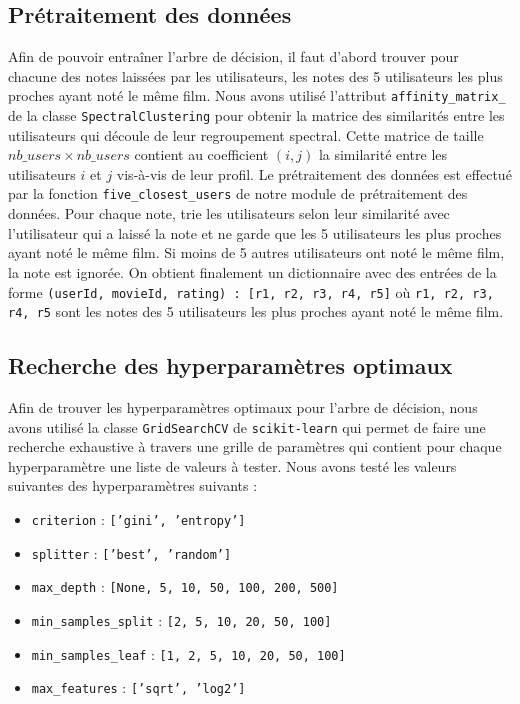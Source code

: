 \documentclass{article}
\begin{document}
\subsection{Prétraitement des données}
Afin de pouvoir entraîner l'arbre de décision, il faut d'abord trouver pour chacune
des notes laissées par les utilisateurs, les notes des 5 utilisateurs les plus
proches ayant noté le même film.
\vskip 0.25cm
Nous avons utilisé l'attribut \texttt{affinity\_matrix\_} de la classe
\texttt{SpectralClustering} pour obtenir la matrice
des similarités entre les utilisateurs qui découle de leur regroupement spectral.
Cette matrice de taille $nb\_users \times nb\_users$ contient au coefficient
$(i, j)$ la similarité entre les utilisateurs $i$ et $j$ vis-à-vis de leur profil.
\vskip 0.25cm
Le prétraitement des données est effectué par la fonction \texttt{five\_closest\_users}
de notre module de prétraitement des données. Pour chaque note, trie les utilisateurs
selon leur similarité avec l'utilisateur qui a laissé la note et ne garde que les
5 utilisateurs les plus proches ayant noté le même film. Si moins de 5 autres utilisateurs
ont noté le même film, la note est ignorée.
\vskip 0.25cm
On obtient finalement un dictionnaire avec des entrées de la forme 
\texttt{(userId, movieId, rating) : [r1, r2, r3, r4, r5]} où \texttt{r1, r2, r3, r4, r5}
sont les notes des 5 utilisateurs les plus proches ayant noté le même film.

\subsection{Recherche des hyperparamètres optimaux}
Afin de trouver les hyperparamètres optimaux pour l'arbre de décision, nous avons
utilisé la classe \texttt{GridSearchCV} de \texttt{scikit-learn} qui permet
de faire une recherche exhaustive à travers une grille de paramètres qui
contient pour chaque hyperparamètre une liste de valeurs à tester.
\vskip 0.25cm
\noindent Nous avons testé les valeurs suivantes des hyperparamètres suivants :

\begin{itemize}
  \item \texttt{criterion} : \texttt{['gini', 'entropy']}
  \item \texttt{splitter} : \texttt{['best', 'random']}
  \item \texttt{max\_depth} : \texttt{[None, 5, 10, 50, 100, 200, 500]}
  \item \texttt{min\_samples\_split} : \texttt{[2, 5, 10, 20, 50, 100]}
  \item \texttt{min\_samples\_leaf} : \texttt{[1, 2, 5, 10, 20, 50, 100]}
  \item \texttt{max\_features} : \texttt{['sqrt', 'log2']}
\end{itemize}
\end{document}

